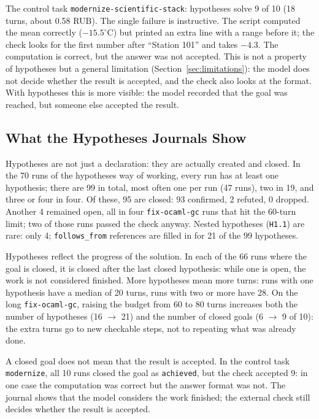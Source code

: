 \documentclass[11pt,a4paper]{article}
\begin{document}
The control task \texttt{modernize-scientific-stack}: hypotheses solve 9 of 10 (18 turns, about
0.58 RUB). The single failure is instructive. The script computed the mean correctly
($-15.5^\circ$C) but printed an extra line with a range before it; the check looks for the first
number after ``Station 101'' and takes $-4.3$. The computation is correct, but the answer was not
accepted. This is not a property of hypotheses but a general limitation
(Section~\ref{sec:limitations}): the model does not decide whether the result is accepted, and the
check also looks at the format. With hypotheses this is more visible: the model recorded that the
goal was reached, but someone else accepted the result.

\subsection{What the Hypotheses Journals Show}
\label{sec:hyp-journals}

Hypotheses are not just a declaration: they are actually created and closed. In the 70 runs of the
hypotheses way of working, every run has at least one hypothesis; there are 99 in total, most
often one per run (47 runs), two in 19, and three or four in four. Of these, 95 are closed: 93
confirmed, 2 refuted, 0 dropped. Another 4 remained open, all in four \texttt{fix-ocaml-gc} runs
that hit the 60-turn limit; two of those runs passed the check anyway. Nested hypotheses
(\texttt{H1.1}) are rare: only 4; \texttt{follows\_from} references are filled in for 21 of the 99
hypotheses.

Hypotheses reflect the progress of the solution. In each of the 66 runs where the goal is closed,
it is closed after the last closed hypothesis: while one is open, the work is not considered
finished. More hypotheses mean more turns: runs with one hypothesis have a median of 20 turns,
runs with two or more have 28. On the long \texttt{fix-ocaml-gc}, raising the budget from 60 to 80
turns increases both the number of hypotheses (16 $\rightarrow$ 21) and the number of closed goals
(6 $\rightarrow$ 9 of 10): the extra turns go to new checkable steps, not to repeating what was
already done.

A closed goal does not mean that the result is accepted. In the control task \texttt{modernize},
all 10 runs closed the goal as \texttt{achieved}, but the check accepted 9: in one case the
computation was correct but the answer format was not. The journal shows that the model considers
the work finished; the external check still decides whether the result is accepted.
\end{document}
